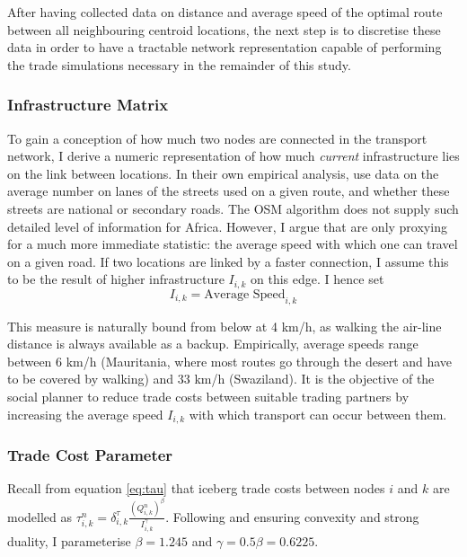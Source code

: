 \documentclass[11pt, oneside]{article}   	%
\begin{document}
After having collected data on distance and average speed of the optimal route between all neighbouring centroid locations, the next step is to discretise these data in order to have a tractable network representation capable of performing the trade simulations necessary in the remainder of this study.

\subsubsection{Infrastructure Matrix }
To gain a conception of how much two nodes are connected in the transport network, I derive a numeric representation of how much \emph{current} infrastructure lies on the link between locations. In their own empirical analysis, \cite{Fajgelbaum_OptimalTransportNetworks_2017} use data on the average number on lanes of the streets used on a given route, and whether these streets are national or secondary roads. The OSM algorithm does not supply such detailed level of information for Africa. However, I argue that \citeauthor{Fajgelbaum_OptimalTransportNetworks_2017} are only proxying for a much more immediate statistic: the average speed with which one can travel on a given road. If two locations are linked by a faster connection, I assume this to be the result of higher infrastructure $I_{i,k}$ on this edge. I hence set
\begin{equation}
  I_{i,k} = \textrm{Average Speed}_{i,k}
\end{equation}

This measure is naturally bound from below at 4 km/h, as walking the air-line distance is always available as a backup. Empirically, average speeds range between 6 km/h (Mauritania, where most routes go through the desert and have to be covered by walking) and 33 km/h (Swaziland). It is the objective of the social planner to reduce trade costs between suitable trading partners by increasing the average speed $I_{i,k}$ with which transport can occur between them.

\subsubsection{Trade Cost Parameter }
Recall from equation \eqref{eq:tau} that iceberg trade costs between nodes $i$ and $k$ are modelled as $\tau_{i,k}^{n} = \delta^{\tau}_{i, k} \frac{(Q_{i,k}^{n})^{\beta}}{I_{i,k}^{\gamma}}$. Following \citeauthor{Fajgelbaum_OptimalTransportNetworks_2017} and ensuring convexity and strong duality, I parameterise $\beta = 1.245$ and $\gamma = 0.5\beta = 0.6225$.
\end{document}
